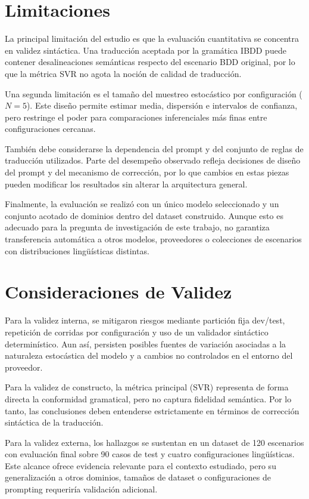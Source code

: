 \section{Limitaciones}

La principal limitación del estudio es que la evaluación cuantitativa se concentra en validez sintáctica. Una traducción aceptada por la gramática IBDD puede contener desalineaciones semánticas respecto del escenario BDD original, por lo que la métrica SVR no agota la noción de calidad de traducción.

Una segunda limitación es el tamaño del muestreo estocástico por configuración ($N=5$). Este diseño permite estimar media, dispersión e intervalos de confianza, pero restringe el poder para comparaciones inferenciales más finas entre configuraciones cercanas.

También debe considerarse la dependencia del prompt y del conjunto de reglas de traducción utilizados. Parte del desempeño observado refleja decisiones de diseño del prompt y del mecanismo de corrección, por lo que cambios en estas piezas pueden modificar los resultados sin alterar la arquitectura general.

Finalmente, la evaluación se realizó con un único modelo seleccionado y un conjunto acotado de dominios dentro del dataset construido. Aunque esto es adecuado para la pregunta de investigación de este trabajo, no garantiza transferencia automática a otros modelos, proveedores o colecciones de escenarios con distribuciones lingüísticas distintas.

\section{Consideraciones de Validez}

Para la validez interna, se mitigaron riesgos mediante partición fija dev/test, repetición de corridas por configuración y uso de un validador sintáctico determinístico. Aun así, persisten posibles fuentes de variación asociadas a la naturaleza estocástica del modelo y a cambios no controlados en el entorno del proveedor.

Para la validez de constructo, la métrica principal (SVR) representa de forma directa la conformidad gramatical, pero no captura fidelidad semántica. Por lo tanto, las conclusiones deben entenderse estrictamente en términos de corrección sintáctica de la traducción.

Para la validez externa, los hallazgos se sustentan en un dataset de 120 escenarios con evaluación final sobre 90 casos de test y cuatro configuraciones lingüísticas. Este alcance ofrece evidencia relevante para el contexto estudiado, pero su generalización a otros dominios, tamaños de dataset o configuraciones de prompting requeriría validación adicional.
